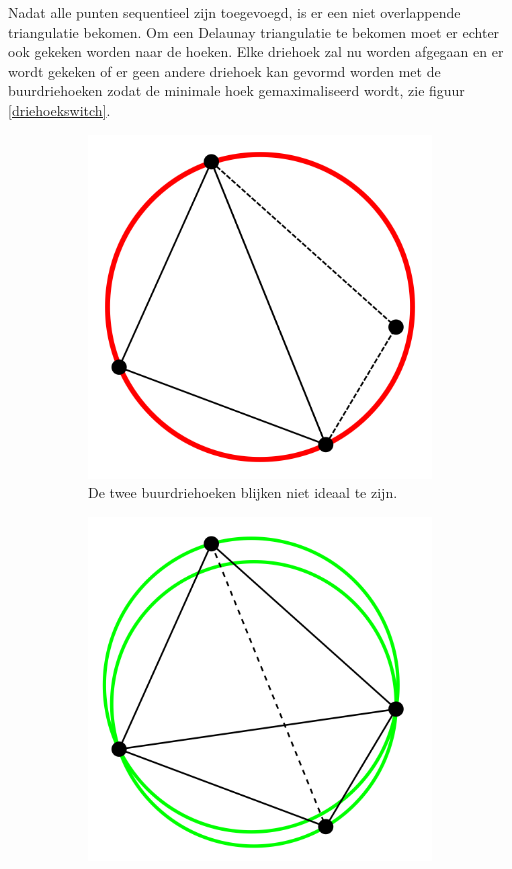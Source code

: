 Nadat alle punten sequentieel zijn toegevoegd, is er een niet overlappende triangulatie bekomen. Om een Delaunay triangulatie te bekomen moet er echter ook gekeken worden naar de hoeken. Elke driehoek zal nu worden afgegaan en er wordt gekeken of er geen andere driehoek kan gevormd worden met de buurdriehoeken zodat de minimale hoek gemaximaliseerd wordt, zie figuur \ref{driehoekswitch}. \cite{s-hull}
\begin{figure}

	\center
	\begin{subfigure}{0.4\textwidth}
		\includegraphics[width=\textwidth]{slechte_driehoek}
		\caption{De twee buurdriehoeken blijken niet ideaal te zijn.}
	\end{subfigure}
	\begin{subfigure}{0.4\textwidth}
		\includegraphics[width=\textwidth]{goede_driehoek}

\end{subfigure}
\end{figure}

